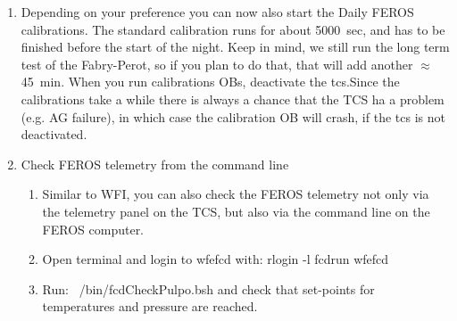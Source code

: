 \documentclass[11pt,fleqn,a4paper]{book}
\makeatletter
\def\menu#1#2{\texttt{#1}\ifx{}#2\else\@for\@x:=#2\do{$\rightarrow$\texttt{\@x}}\fi}
\def\wmenu#1#2{window menu \menu{#1}{#2}}
\makeatother
\begin{document}
\begin{enumerate}
\begin{enumerate}
\begin{enumerate}
\begin{enumerate}
              \item Click \texttt{OK} on the error popups, one should say \texttt{error closing \gls{w2p2cam}}
              \item In \gls{bob}, click on \texttt{Reset status}
              \item Re-run it (point \ref{list:ferostestob}).
            \end{enumerate}
            \item \texttt{FEROS \gls{General State}} panel, select \wmenu{Telescope}{IGNORE}
           \end{enumerate}
          \item Depending on your preference you can now also start the Daily FEROS calibrations. The standard calibration runs for about 5000~sec, and has to be finished before the start of the night. Keep in mind, we still run the long term test of the Fabry-Perot, so if you plan to do that, that will add another $\approx$ 45~min. When you run calibrations OBs, deactivate the \gls{tcs}.Since the calibrations take a while there is always a chance that the TCS ha a problem (e.g. AG failure), in which case the calibration OB will crash, if the \gls{tcs} is not deactivated.
        \item \label{lab:pulpo} Check FEROS telemetry from the command line
         \begin{enumerate}
         	\item Similar to WFI, you can also check the FEROS telemetry not only via the telemetry panel on the TCS, but also via the command line on the FEROS computer.
         	\item Open terminal and login to wfefcd with: rlogin -l fcdrun wfefcd 
         	\item Run: ~/bin/fcdCheckPulpo.bsh  and check that set-points for temperatures and pressure are reached.
        \end{enumerate}
        

\end{enumerate}
\end{enumerate}
\end{document}
